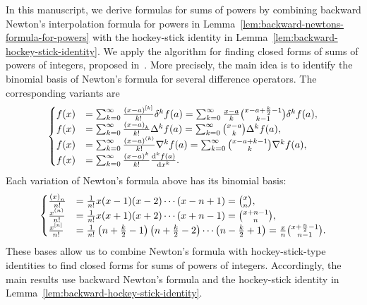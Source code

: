 In this manuscript, we derive formulas for sums of powers by combining
backward Newton's interpolation formula for powers in Lemma~\eqref{lem:backward-newtons-formula-for-powers}
with the hockey-stick identity in Lemma~\eqref{lem:backward-hockey-stick-identity}.
We apply the algorithm for finding closed forms of
sums of powers of integers, proposed in~\cite[Alg. (11.2)]{kolosov2026framework}.
More precisely, the main idea is to identify the binomial basis of
Newton's formula for several difference operators. The corresponding
variants are
\begin{align*}
  \begin{cases}
    f(x)
    &= \sum_{k=0}^{\infty} \frac{(x-a)^{[k]}}{k!} \delta^{k} f(a)
    = \sum_{k=0}^{\infty} \frac{x-a}{k} \binom{x-a+\frac{k}{2}-1}{k-1} \delta^{k} f(a), \\
    f(x)
    &= \sum_{k=0}^{\infty} \frac{\left(x-a\right)_{k}}{k!} \Delta^k f(a)
    = \sum_{k=0}^{\infty} \binom{x-a}{k} \Delta^k f(a), \\
    f(x)
    &= \sum_{k=0}^{\infty} \frac{(x-a)^{\left(k\right)}}{k!} \nabla^k f(a)
    = \sum_{k=0}^{\infty} \binom{x-a+k-1}{k} \nabla^k f(a), \\
    f(x)
    &= \sum_{k=0}^{\infty} \frac{(x-a)^k}{k!} \frac{\mathrm{d}^{k} f(a)}{\mathrm{d} x^{k}}.
  \end{cases}
\end{align*}
Each variation of Newton's formula above has its binomial basis:
\begin{align*}
  \begin{cases}
    \frac{\left(x\right)_{n}}{n!} &= \frac{1}{n!} x(x-1)(x-2)\cdots(x-n+1) =\binom{x}{n}, \\
    \frac{x^{\left(n\right)}}{n!}  &= \frac{1}{n!} x(x+1)(x+2)\cdots(x+n-1)  =\binom{x+n-1}{n}, \\
    \frac{x^{[n]}}{n!} &= \frac{1}{n!} \left( n + \frac{k}{2} -1 \right)\left( n + \frac{k}{2} -2 \right)
    \cdots \left( n - \frac{k}{2} +1 \right)  =\frac{x}{n} \binom{x+\frac{n}{2}-1}{n-1}.
  \end{cases}
\end{align*}
These bases allow us to combine Newton's formula with
hockey-stick-type identities to find closed forms for sums of powers
of integers.
Accordingly, the main results use backward Newton's formula and the
hockey-stick identity in Lemma~\eqref{lem:backward-hockey-stick-identity}.
